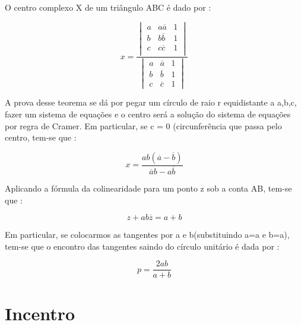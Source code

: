 \documentclass{article}
\begin{document}
\begin{tcolorbox}[colback=blue!5!white,colframe=blue!75!black,title=Circuncentro complexo\emoji{nerd-face}]

O centro complexo X de um triângulo ABC é dado por : 

$$
x = 
\frac{
\begin{vmatrix}
    a & a \overline{a} & 1 \\
    b & b \overline{b} & 1 \\
    c & c \overline{c} & 1 \\
\end{vmatrix}
}
{
\begin{vmatrix}
a & \overline{a} & 1 \\
b & \overline{b} & 1 \\
c & \overline{c} & 1
\end{vmatrix}
}
$$

\end{tcolorbox}
A prova desse teorema se dá por pegar um círculo de raio r equidistante a a,b,c, fazer um sistema de equações e o centro será a solução do sistema de equações por regra de Cramer.
Em particular, se c = 0 (circunferência que passa pelo centro, tem-se que : 

$$x = \frac{ab(\overline{a} - \overline{b})}{\overline{a} b - a \overline{b}}$$

\begin{tcolorbox}[colback=blue!5!white,colframe=blue!75!black,title=Equação da corda(círculo unitário)\emoji{nerd-face}]
Aplicando a fórmula da colinearidade para um ponto z sob a conta AB, tem-se que : 

$$z + ab \overline{z} = a + b$$
\end{tcolorbox}

Em particular, se colocarmos as tangentes por a e b(substituindo a=a e b=a), tem-se que o encontro das tangentes saindo do círculo unitário é dada por : 

$$p = \frac{2ab}{a+b}$$

\section{Incentro}
\end{document}
